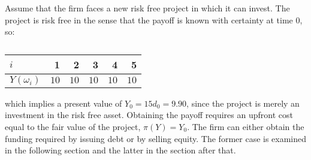 \documentclass[main.tex]{subfiles}
\begin{document}
    Assume that the firm faces a new risk free project in which it can invest.
    The project is risk free in the sense that the payoff is known with certainty at time 0, so:
        \begin{table}[H]
            \centering
            \begin{tabular}{l|rrrrr}
                $i$ & 1 & 2 & 3 & 4 & 5 \\
                \hline
                $Y(\omega_{i})$ & $10$ & $10$ & $10$ & $10$ & $10$
            \end{tabular}
            \caption{}
        \end{table}
    which implies a present value of $Y_{0} = 15d_{0} = 9.90$, 
    since the project is merely an investment in the risk free asset.
    Obtaining the payoff requires an upfront cost equal to the fair value of the project, $\pi(Y) = Y_{0}$.
    The firm can either obtain the funding required by issuing debt or by selling equity.
    The former case is examined in the following section and the latter in the section after that.
\end{document}
